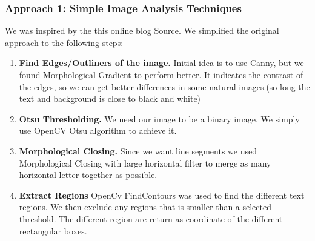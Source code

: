 \documentclass[Report.tex]{subfiles}
\begin{document}
\begin{flushleft}
  \subsubsection{Approach 1: Simple Image Analysis Techniques}
  We was inspired by the this online blog \href{https://www.danvk.org/2015/01/07/finding-blocks-of-text-in-an-image-using-python-opencv-and-numpy.html}{Source}\cite{_finding_????}. We simplified the original approach to the following steps:
  \begin{enumerate}
    \item \textbf{Find Edges/Outliners of the image.}
    Initial idea is to use Canny, but we found Morphological Gradient to perform better. It indicates the contrast of the edges, so we can get better differences in some natural images.(so long the text and background is close to black and white)
    \item \textbf{Otsu Thresholding.}
    We need our image to be a binary image. We simply use OpenCV Otsu algorithm to achieve it.
    \item \textbf{Morphological Closing.}
    Since we want line segments we used Morphological Closing with large horizontal filter to merge as many horizontal letter together as possible.
    \item \textbf{Extract Regions}
    OpenCv FindContours was used to find the different text regions. We then exclude any regions that is smaller than a selected threshold. The different region are return as coordinate of the different rectangular boxes.
  \end{enumerate}
\end{flushleft}
\end{document}
